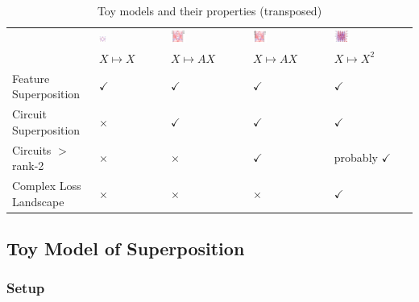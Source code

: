 \documentclass{article}
\theoremstyle{plain}
\theoremstyle{definition}
\theoremstyle{remark}
\begin{document}
\begin{table}[htb]
\begin{tabularx}{\textwidth}{X X X X X}
        \hline
        & \includegraphics[width=0.12\textwidth]{../figures/2a_toy_models_setup.pdf} &
        \includegraphics[width=0.2\textwidth]{../figures/2b_toy_models_setup.pdf} &
        \includegraphics[width=0.2\textwidth]{../figures/2c_toy_models_setup.pdf} &
        \includegraphics[width=0.2\textwidth]{../figures/2d_toy_models_setup.pdf} \\
         & $X \mapsto X$ & $X \mapsto A X$ & $X \mapsto A X$ & $X \mapsto X^2$ \\  
        Feature Superposition & $\checkmark$ & $\checkmark$ & $\checkmark$ & $\checkmark$ \\  
        Circuit Superposition & $\times$ & $\checkmark$ & $\checkmark$ & $\checkmark$ \\  
        Circuits $>$ rank-2 & $\times$ & $\times$ & $\checkmark$ & probably $\checkmark$ \\  
        Complex Loss Landscape & $\times$ & $\times$ & $\times$ & $\checkmark$ \\  
        \bottomrule
    \end{tabularx}
    \caption{Toy models and their properties (transposed)}
    \label{tab:toy_models}
\end{table}

\subsection{Toy Model of Superposition}

\subsubsection{Setup}
\end{document}
